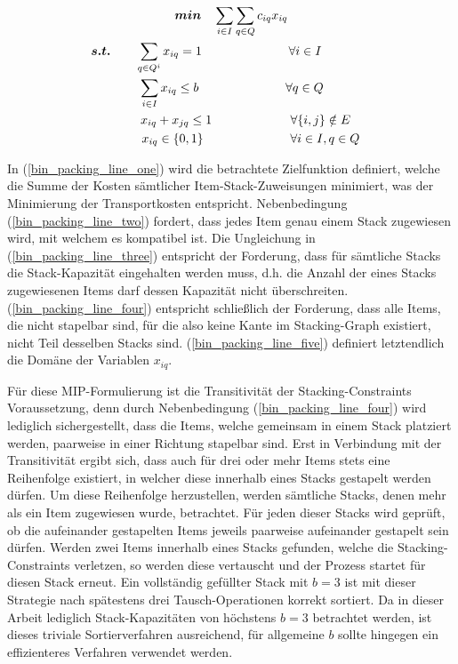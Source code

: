 \vfill
\pagebreak

\begin{gather}
\boldsymbol{min} \quad \sum_{i \in I} \sum_{q \in Q} c_{iq} x_{iq} \label{bin_packing_line_one} \\
\thinspace\thinspace \boldsymbol{s.t.} \quad \quad \sum_{q \in Q^i} x_{iq} = 1 \quad\quad\quad\quad\quad\quad\quad \forall i \in I \quad\quad\quad\quad\thinspace\thinspace \label{bin_packing_line_two} \\
\thinspace \sum_{i \in I} x_{iq} \leq b \quad\quad\quad\quad\quad\quad\quad \forall q \in Q \label{bin_packing_line_three} \\
\thinspace\thinspace\quad\quad x_{iq} + x_{jq} \leq 1 \quad\quad\thinspace\thinspace\quad\quad\quad\quad \forall \{i, j\} \notin E \label{bin_packing_line_four} \\
\thinspace\thinspace\quad\quad\quad x_{iq} \in \{0, 1\} \thinspace\thinspace\thinspace\thinspace\thinspace\thinspace\quad\quad\quad\quad\quad\quad \forall i \in I, q \in Q \thinspace \label{bin_packing_line_five}
\end{gather}

In (\ref{bin_packing_line_one}) wird die betrachtete Zielfunktion definiert, welche die Summe der Kosten sämtlicher
Item-Stack-Zuweisungen minimiert, was der Minimierung der Transportkosten entspricht.
Nebenbedingung (\ref{bin_packing_line_two}) fordert, dass jedes Item genau einem Stack zugewiesen wird, mit welchem es kompatibel ist.
Die Ungleichung in (\ref{bin_packing_line_three}) entspricht der Forderung, dass für sämtliche Stacks die Stack-Kapazität eingehalten werden muss, d.h.
die Anzahl der eines Stacks zugewiesenen Items darf dessen Kapazität nicht überschreiten. (\ref{bin_packing_line_four}) entspricht schließlich der Forderung, dass alle Items, die nicht stapelbar sind, für die also keine Kante im Stacking-Graph existiert, nicht Teil desselben Stacks sind. (\ref{bin_packing_line_five}) definiert letztendlich die Domäne der Variablen $x_{iq}$.

Für diese MIP-Formulierung ist die Transitivität der Stacking-Constraints Voraussetzung, denn durch Nebenbedingung (\ref{bin_packing_line_four}) wird lediglich sichergestellt, dass die Items, welche gemeinsam in einem Stack platziert werden,
paarweise in einer Richtung stapelbar sind. Erst in Verbindung mit der Transitivität ergibt sich, dass auch für drei oder
mehr Items stets eine Reihenfolge existiert, in welcher diese innerhalb eines Stacks gestapelt werden dürfen.
Um diese Reihenfolge herzustellen, werden sämtliche Stacks, denen mehr als ein Item zugewiesen wurde, betrachtet. Für jeden
dieser Stacks wird geprüft, ob die aufeinander gestapelten Items jeweils paarweise aufeinander gestapelt sein dürfen.
Werden zwei Items innerhalb eines Stacks gefunden, welche die Stacking-Constraints verletzen, so werden diese
vertauscht und der Prozess startet für diesen Stack erneut. Ein vollständig gefüllter Stack mit $b = 3$ ist mit dieser
Strategie nach spätestens drei Tausch-Operationen korrekt sortiert. Da in dieser Arbeit lediglich Stack-Kapazitäten
von höchstens $b = 3$ betrachtet werden, ist dieses triviale Sortierverfahren ausreichend, für allgemeine $b$ sollte
hingegen ein effizienteres Verfahren verwendet werden.

